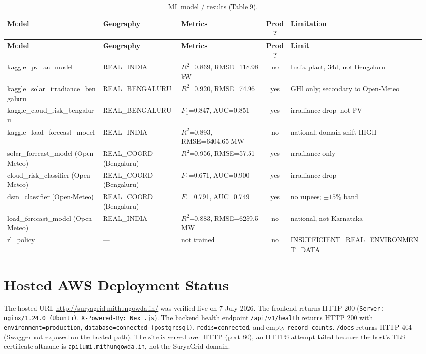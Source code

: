 \documentclass[11pt,a4paper]{article}
\newcommand{\yes}{\textcolor{cok}{yes}}
\newcommand{\no}{\textcolor{cmiss}{no}}
\newcommand{\code}[1]{\texttt{\small #1}}
\begin{document}
\begin{footnotesize}
\begin{longtable}{@{}p{3.0cm}p{2.0cm}p{2.6cm}c p{2.4cm}@{}}
\caption{ML model / results (Table 9).}\label{tab:ml}\\
\toprule
\textbf{Model} & \textbf{Geography} & \textbf{Metrics} & \textbf{Prod?} & \textbf{Limitation}\\
\midrule\endfirsthead
\toprule \textbf{Model} & \textbf{Geography} & \textbf{Metrics} & \textbf{Prod?} & \textbf{Limit}\\ \midrule\endhead
\bottomrule\endfoot
kaggle\_pv\_ac\_model & REAL\_INDIA & $R^2$=0.869, RMSE=118.98 kW & \no & India plant, 34d, not Bengaluru\\
kaggle\_solar\_irradiance\_bengaluru & REAL\_BENGALURU & $R^2$=0.920, RMSE=74.96 & \yes & GHI only; secondary to Open-Meteo\\
kaggle\_cloud\_risk\_bengaluru & REAL\_BENGALURU & $F_1$=0.847, AUC=0.851 & \yes & irradiance drop, not PV\\
kaggle\_load\_forecast\_model & REAL\_INDIA & $R^2$=0.893, RMSE=6404.65 MW & \no & national, domain shift HIGH\\
solar\_forecast\_model (Open-Meteo) & REAL\_COORD (Bengaluru) & $R^2$=0.956, RMSE=57.51 & \yes & irradiance only\\
cloud\_risk\_classifier (Open-Meteo) & REAL\_COORD (Bengaluru) & $F_1$=0.671, AUC=0.900 & \yes & irradiance drop\\
dsm\_classifier (Open-Meteo) & REAL\_COORD (Bengaluru) & $F_1$=0.791, AUC=0.749 & \yes & no rupees; $\pm15\%$ band\\
load\_forecast\_model (Open-Meteo) & REAL\_INDIA & $R^2$=0.883, RMSE=6259.5 MW & \no & national, not Karnataka\\
rl\_policy & --- & not trained & \no & INSUFFICIENT\_REAL\_ENVIRONMENT\_DATA\\
\end{longtable}
\end{footnotesize}

\section{Hosted AWS Deployment Status}\label{sec:aws}
The hosted URL \url{http://suryagrid.mithungowda.in/} was verified live on 7 July 2026.
The frontend returns HTTP 200 (\code{Server: nginx/1.24.0 (Ubuntu)}, \code{X-Powered-By:
Next.js}). The backend health endpoint \code{/api/v1/health} returns HTTP 200 with
\code{environment=production}, \code{database=connected (postgresql)}, \code{redis=connected},
and empty \code{record\_counts}. \code{/docs} returns HTTP 404 (Swagger not exposed on the
hosted path). The site is served over HTTP (port 80); an HTTPS attempt failed because the
host's TLS certificate altname is \code{apilumi.mithungowda.in}, not the SuryaGrid domain.
\end{document}
